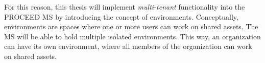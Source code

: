 
For this reason, this thesis will implement \textit{multi-tenant} functionality into the PROCEED MS by introducing the concept of environments.
Conceptually, environments are spaces where one or more users can work on shared assets.
The MS will be able to hold multiple isolated environments.
This way, an organization can have its own environment, where all members of the
organization can work on shared assets.


